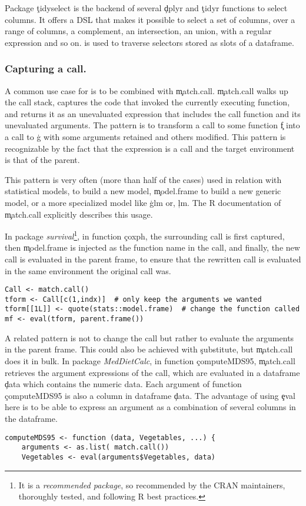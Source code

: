 \documentclass[review,screen,acmsmall,anonymous=true]{acmart}
\begin{document}
Package \c{tidyselect} is the backend of several \c{dplyr} and \c{tidyr} functions to select columns. It offers a DSL that makes it possible to select a set of columns, over a range of columns, a complement, an intersection, an union, with a regular expression and so on. \eval is used to traverse selectors stored as slots of a dataframe.


\subsubsection{Capturing a call.}  A common use case for \eval is to be combined with \c{match.call}.
\c{match.call} walks up the call stack, captures the code that invoked the
currently executing function, and returns it as an unevaluated expression that includes the call function and its unevaluated arguments. The pattern is to transform a call to some function \c{f} into a call to \c{g} with some arguments retained and others modified. This pattern is recognizable
by the fact that the expression is a call and the target environment is that of
the parent.

This pattern is very often (more than half of the cases) used in relation with statistical models, to build a new model, \c{model.frame} to build a new generic model, or a more specialized model like \c{glm} or, \c{lm}. The R documentation of \c{match.call} explicitly describes this usage.

In package \emph{survival}\footnote{It is a \emph{recommended package}, so recommended by the CRAN maintainers, thoroughly tested, and following R best practices.}, in function \c{coxph}, the surrounding call is first captured, then \c{model.frame} is injected as the function name in the call, and finally, the new call is evaluated in the parent frame, to ensure that the rewritten call
is evaluated in the same environment the original call was.

\begin{lstlisting}
Call <- match.call()
tform <- Call[c(1,indx)]  # only keep the arguments we wanted
tform[[1L]] <- quote(stats::model.frame)  # change the function called
mf <- eval(tform, parent.frame())
\end{lstlisting}

A related pattern is not to change the call but rather to evaluate the arguments in the parent frame. This could also be achieved with \c{substitute}, but \c{match.call} does it in bulk.
In package \emph{MedDietCalc},  in function \c{computeMDS95}, \c{match.call} retrieves the argument expressions of the call, which are evaluated in a dataframe \c{data} which contains the numeric data. Each argument of function \c{computeMDS95} is also a column in dataframe \c{data}. The advantage of using \c{eval} here is to be able to express an argument as a combination of several columns in the dataframe.
\begin{lstlisting}
computeMDS95 <- function (data, Vegetables, ...) {
	arguments <- as.list( match.call())
	Vegetables <- eval(arguments$Vegetables, data) 
\end{lstlisting}
\end{document}
